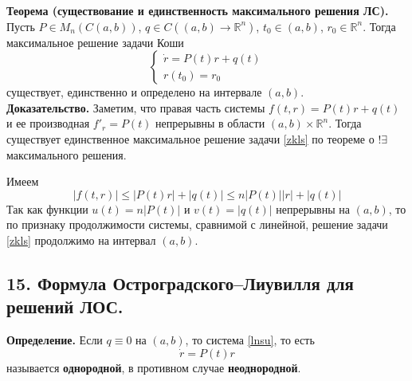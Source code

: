 \noindent \textbf{Теорема (существование и единственность максимального решения ЛС).} Пусть $P \in M_n(C(a,b))$, $q \in C((a,b) \to \mathbb{R}^n)$, $t_0 \in (a,b)$, $r_0 \in \mathbb{R}^n$. Тогда максимальное решение задачи Коши
\begin{equation}
    \begin{cases}
        \dot{r} = P(t)r + q(t) \\
        r(t_0) = r_0
    \end{cases} \label{zkls}
\end{equation}
существует, единственно и определено на интервале $(a,b)$.\\

\noindent \textbf{Доказательство.} Заметим, что правая часть системы $f(t,r) = P(t)r + q(t)$ и ее производная $f'_r = P(t)$ непрерывны в области $(a,b) \times \mathbb{R}^n$. Тогда существует единственное максимальное решение задачи \eqref{zkls} по теореме о \(!\exists\) максимального решения.

Имеем
\begin{equation*}
    |f(t,r)| \le |P(t)r| + |q(t)| \le n|P(t)||r| + |q(t)|
\end{equation*}
Так как функции $u(t) = n|P(t)|$ и $v(t) = |q(t)|$ непрерывны на $(a,b)$, то по признаку продолжимости системы, сравнимой с линейной, решение задачи \eqref{zkls} продолжимо на интервал $(a,b)$.

\subsection*{15. Формула Остроградского–Лиувилля для решений ЛОС.}

\textbf{Определение.} Если $q \equiv 0$ на $(a,b)$, то система \eqref{lnsu}, то есть
\begin{equation}
    \dot{r} = P(t)r \label{losu}
\end{equation}
называется \textbf{однородной}, в противном случае \textbf{неоднородной}.\\


